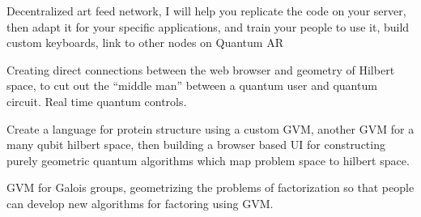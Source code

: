 \documentclass[11pt]{article}
\begin{document}
    Decentralized art feed network, I will help you replicate the code on your server, then adapt it for your specific applications, and train your people to use it, build custom keyboards, link to other nodes on Quantum AR





Creating direct connections between the web browser and geometry of Hilbert space, to cut out the ``middle man'' between a quantum user and quantum circuit.  Real time quantum controls.    




    Create a language for protein structure using a custom GVM, another GVM for a many qubit hilbert space, then building a browser based UI for constructing purely geometric quantum algorithms which map problem space to hilbert space.  




    GVM for Galois groups, geometrizing the problems of factorization so that people can develop new algorithms for factoring using GVM.
\end{document}
